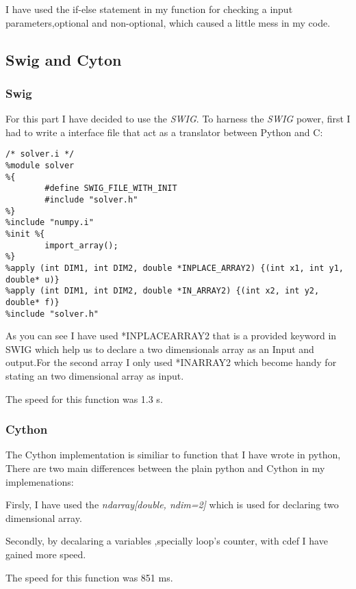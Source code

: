 \documentclass{article}
\begin{document}
\par
I have used the if-else statement in my function for checking a input parameters,optional and non-optional, which caused a little mess in my code.
\subsection{Swig and Cyton}

\subsubsection{Swig}For this part I have decided to use the \textit{SWIG}. To harness the \textit{SWIG} power, first I had to write a interface file that act as a translator between Python and C:
\begin{verbatim}
/* solver.i */
%module solver
%{
        #define SWIG_FILE_WITH_INIT
        #include "solver.h"
%}
%include "numpy.i"
%init %{
        import_array();
%}
%apply (int DIM1, int DIM2, double *INPLACE_ARRAY2) {(int x1, int y1, double* u)}
%apply (int DIM1, int DIM2, double *IN_ARRAY2) {(int x2, int y2, double* f)}
%include "solver.h"
\end{verbatim}
 
 \par As you can see I have used *INPLACE\textunderscore ARRAY2 that is a provided keyword in SWIG which help us to declare a two dimensionals array as an Input and output.For the second array I only used  *IN\textunderscore ARRAY2 which become handy for stating an two dimensional array as input.
 \par The speed for this function was 1.3 s. 
\subsubsection{Cython}
The Cython implementation is similiar to function that I have wrote in python, There are two main differences between the plain python and Cython in my implemenations:

\par Firsly, I have used the \textit{ndarray[double, ndim=2]} which is used for declaring two dimensional array.
\par Secondly, by decalaring a variables ,specially loop's counter, with cdef I have gained more speed.

\par The speed for this function was 851 ms. 
\end{document}
